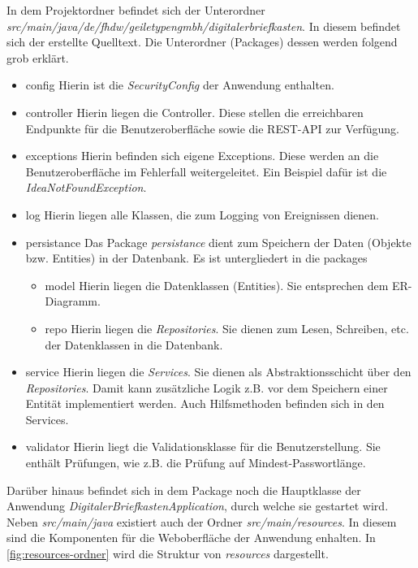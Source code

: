 In dem Projektordner befindet sich der Unterordner \textit{src/main/java/de/fhdw/geiletypengmbh/digitalerbriefkasten}. In diesem
befindet sich der erstellte Quelltext. Die Unterordner (Packages) dessen werden folgend grob erklärt.
\begin{itemize}
    \item config
    \subitem Hierin ist die \textit{SecurityConfig} der Anwendung enthalten.
    \item controller
    \subitem Hierin liegen die Controller. Diese stellen die erreichbaren Endpunkte für die Benutzeroberfläche sowie die REST-API zur Verfügung.
    \item exceptions
    \subitem Hierin befinden sich eigene Exceptions. Diese werden an die Benutzeroberfläche im Fehlerfall weitergeleitet. Ein Beispiel dafür ist die \textit{IdeaNotFoundException}.
    \item log
    \subitem Hierin liegen alle Klassen, die zum Logging von Ereignissen dienen.
    \item persistance
    \subitem Das Package \textit{persistance} dient zum Speichern der Daten (Objekte bzw. Entities) in der Datenbank. Es ist untergliedert
    in die packages
    \begin{itemize}
        \item model
        \subitem Hierin liegen die Datenklassen (Entities). Sie entsprechen dem ER-Diagramm.
        \item repo
        \subitem Hierin liegen die \textit{Repositories}. Sie dienen zum Lesen, Schreiben, etc. der Datenklassen in die Datenbank.
    \end{itemize}
    \item service
    \subitem Hierin liegen die \textit{Services}. Sie dienen als Abstraktionsschicht über den \textit{Repositories}. Damit kann zusätzliche Logik z.B. vor dem Speichern einer Entität implementiert werden. Auch Hilfsmethoden befinden sich in den Services.
    \item validator
    \subitem Hierin liegt die Validationsklasse für die Benutzerstellung. Sie enthält Prüfungen, wie z.B. die Prüfung auf Mindest-Passwortlänge.
\end{itemize}
Darüber hinaus befindet sich in dem Package noch die Hauptklasse der Anwendung \textit{DigitalerBriefkastenApplication}, durch welche sie gestartet wird.
\newline
Neben \textit{src/main/java} existiert auch der Ordner \textit{src/main/resources}. In diesem sind die Komponenten für die Weboberfläche der Anwendung enhalten.
In \cref{fig:resources-ordner} wird die Struktur von \textit{resources} dargestellt.

